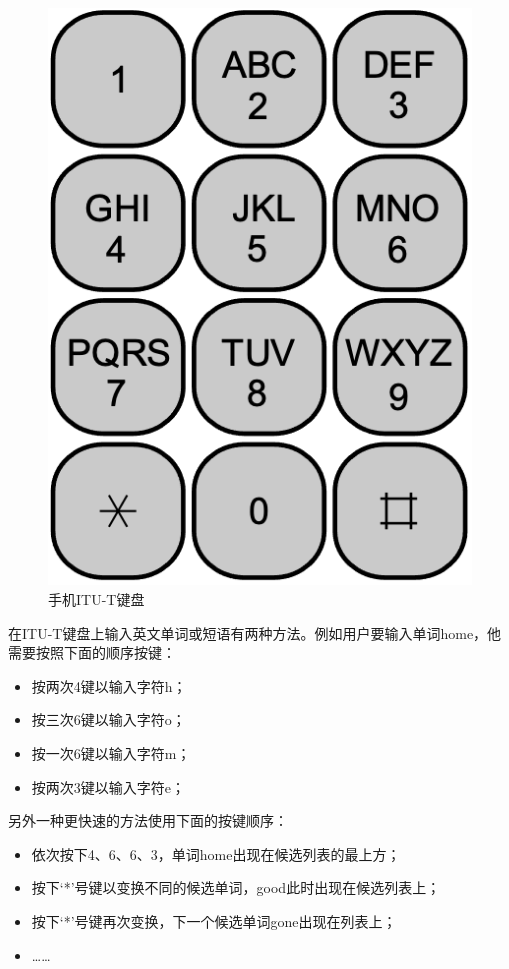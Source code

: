 \documentclass[b5paper]{ctexart}
\begin{document}
\begin{figure}[htbp]
  \centering
  \includegraphics[scale=0.4]{img/itu-t.png}
  \caption{手机ITU-T键盘}
  \label{fig:itut-keypad}
\end{figure}

在ITU-T键盘上输入英文单词或短语有两种方法。例如用户要输入单词home，他需要按照下面的顺序按键：

\begin{itemize}
\item 按两次4键以输入字符h；
\item 按三次6键以输入字符o；
\item 按一次6键以输入字符m；
\item 按两次3键以输入字符e；
\end{itemize}

另外一种更快速的方法使用下面的按键顺序：

\begin{itemize}
\item 依次按下4、6、6、3，单词home出现在候选列表的最上方；
\item 按下‘*’号键以变换不同的候选单词，good此时出现在候选列表上；
\item 按下‘*’号键再次变换，下一个候选单词gone出现在列表上；
\item ……
\end{itemize}
\end{document}
